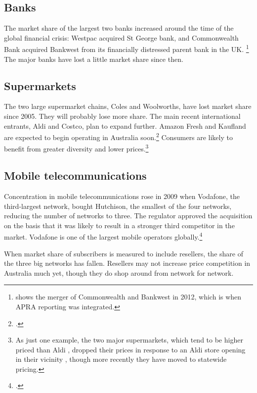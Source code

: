 \subsection{Banks}
The market share of the largest two banks increased around the time of the global financial crisis: Westpac acquired St George bank, and Commonwealth Bank acquired Bankwest from its financially distressed parent bank in the UK\@.%
\footnote{ shows the merger of Commonwealth and Bankwest in 2012, which is when APRA reporting was integrated.}
The major banks have lost a little market share since then. 

\subsection{Supermarkets}

The two large supermarket chains, Coles and Woolworths, have lost market share since 2005. They will probably lose more share. The main recent international entrants, Aldi and Costco, plan to expand further. Amazon Fresh and Kaufland are expected to begin operating in Australia soon.\footcites{Kaufland_2017}{AmazonFresh_2017} %
Consumers are likely to benefit from greater diversity and lower prices.\footnote{As just one example, the two major supermarkets, which tend to be higher priced than Aldi \parencite{Choice-supermarket-want-to-spend-less}, dropped their prices in response to an Aldi store opening in their vicinity \parencite{ACCC-grocery-2008}, though more recently they have moved to statewide pricing.}


\subsection{Mobile telecommunications}

Concentration in mobile telecommunications rose in 2009 when Vodafone, the third-largest network, bought Hutchison, the smallest of the four networks, reducing the number of networks to three. The regulator approved the acquisition on the basis that it was likely to result in a stronger third competitor in the market. Vodafone is one of the largest mobile operators globally.\footcite{ACCC_mobile_2009} 

When market share of subscribers is measured to include resellers, the share of the three big networks has fallen. Resellers may not increase price competition in Australia much yet, though they do shop around from network for network. 

